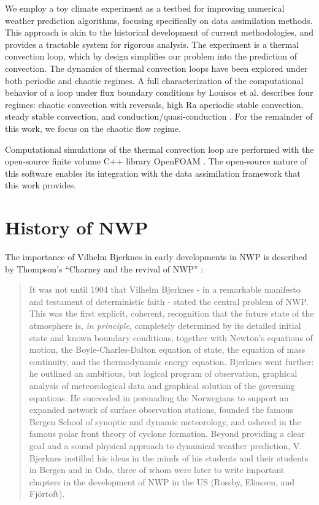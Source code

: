 \documentclass[12pt]{report}
\begin{document}
We employ a toy climate experiment as a testbed for improving numerical weather prediction algorithms, focusing specifically on data assimilation methods.
This approach is akin to the historical development of current methodologies, and provides a tractable system for rigorous analysis.
The experiment is a thermal convection loop, which by design simplifies our problem into the prediction of convection.
The dynamics of thermal convection loops have been explored under both periodic  and chaotic  regimes.
A full characterization of the computational behavior of a loop under flux boundary conditions by Louisos et al. describes four regimes: chaotic convection with reversals, high Ra aperiodic stable convection, steady stable convection, and conduction/quasi-conduction .
For the remainder of this work, we focus on the chaotic flow regime.

Computational simulations of the thermal convection loop are performed with the open-source finite volume C++ library OpenFOAM .
The open-source nature of this software enables its integration with the data assimilation framework that this work provides.

\section{History of NWP}

The importance of Vilhelm Bjerknes in early developments in NWP is described by Thompson's ``Charney and the revival of NWP'' :

\begin{quote}
It was not until 1904 that Vilhelm Bjerknes - in a remarkable manifesto and testament of deterministic faith - stated the central problem of NWP.
This was the first explicit, coherent, recognition that the future state of the atmosphere is, \emph{in principle}, completely determined by its detailed initial state and known boundary conditions, together with Newton's equations of motion, the Boyle-Charles-Dalton equation of state, the equation of mass continuity, and the thermodynamic energy equation.
Bjerknes went further: he outlined an ambitious, but logical program of observation, graphical analysis of meteorological data and graphical solution of the governing equations.
He succeeded in persuading the Norwegians to support an expanded network of surface observation stations, founded the famous Bergen School of synoptic and dynamic meteorology, and ushered in the famous polar front theory of cyclone formation.
Beyond providing a clear goal and a sound physical approach to dynamical weather prediction, V. Bjerknes instilled his ideas in the minds of his students and their students in Bergen and in Oslo, three of whom were later to write important chapters in the development of NWP in the US (Rossby, Eliassen, and Fj\"{o}rtoft).
\end{quote}
\end{document}
